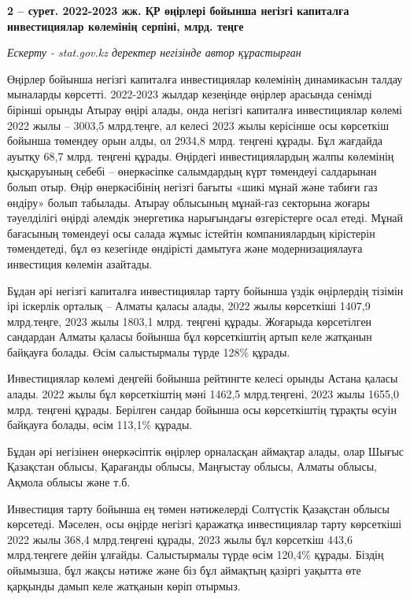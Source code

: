 {\bfseries 2 -- сурет. 2022-2023 жж. ҚР өңірлері бойынша негізгі капиталға
инвестициялар көлемінің серпіні, млрд. теңге}

\emph{Ескерту - stat.gov.kz деректер негізінде автор құрастырған}

\begin{multicols}{2}
Өңірлер бойынша негізгі капиталға инвестициялар көлемінің динамикасын
талдау мыналарды көрсетті. 2022-2023 жылдар кезеңінде өңірлер арасында
сенімді бірінші орынды Атырау өңірі алады, онда негізгі капиталға
инвестициялар көлемі 2022 жылы -- 3003,5 млрд.теңге, ал келесі 2023 жылы
керісінше осы көрсеткіш бойынша төмендеу орын алды, ол 2934,8 млрд.
теңгені құрады. Бұл жағдайда ауытқу 68,7 млрд. теңгені құрады. Өңірдегі
инвестициялардың жалпы көлемінің қысқаруының себебі -- өнеркәсіпке
салымдардың күрт төмендеуі салдарынан болып отыр. Өңір өнеркәсібінің
негізгі бағыты «шикі мұнай және табиғи газ өндіру» болып табылады.
Атырау облысының мұнай-газ секторына жоғары тәуелділігі өңірді әлемдік
энергетика нарығындағы өзгерістерге осал етеді. Мұнай бағасының
төмендеуі осы салада жұмыс істейтін компаниялардың кірістерін
төмендетеді, бұл өз кезегінде өндірісті дамытуға және модернизациялауға
инвестиция көлемін азайтады.

Бұдан әрі негізгі капиталға инвестициялар тарту бойынша үздік өңірлердің
тізімін ірі іскерлік орталық -- Алматы қаласы алады, 2022 жылы
көрсеткіші 1407,9 млрд.теңге, 2023 жылы 1803,1 млрд. теңгені құрады.
Жоғарыда көрсетілген сандардан Алматы қаласы бойынша бұл көрсеткіштің
артып келе жатқанын байқауға болады. Өсім салыстырмалы түрде 128\%
құрады.

Инвестициялар көлемі деңгейі бойынша рейтингте келесі орынды Астана
қаласы алады. 2022 жылы бұл көрсеткіштің мәні 1462,5 млрд.теңгені, 2023
жылы 1655,0 млрд. теңгені құрады. Берілген сандар бойынша осы
көрсеткіштің тұрақты өсуін байқауға болады, өсім 113,1\% құрады.

Бұдан әрі негізінен өнеркәсіптік өңірлер орналасқан аймақтар алады, олар
Шығыс Қазақстан облысы, Қарағанды облысы, Маңғыстау облысы, Алматы
облысы, Ақмола облысы және т.б.

Инвестиция тарту бойынша ең төмен нәтижелерді Солтүстік Қазақстан облысы
көрсетеді. Мәселен, осы өңірде негізгі қаражатқа инвестициялар тарту
көрсеткіші 2022 жылы 368,4 млрд.теңгені құрады, 2023 жылы бұл көрсеткіш
443,6 млрд.теңгеге дейін ұлғайды. Салыстырмалы түрде өсім 120,4\%
құрады. Біздің ойымызша, бұл жақсы нәтиже және біз бұл аймақтың қазіргі
уақытта өте қарқынды дамып келе жатқанын көріп отырмыз.
\end{multicols}

